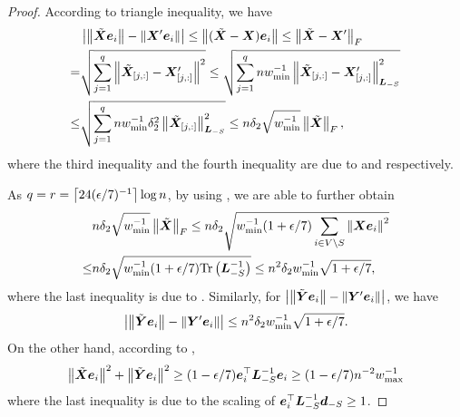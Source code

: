 \documentclass[sigconf]{acmart}
\begin{document}
\begin{proof}
    According to triangle inequality, we have
    \begin{align*}
            & \left|\left\Vert\tilde{\boldsymbol{X}}\boldsymbol{e}_i\right\Vert-\left\Vert\boldsymbol{X}'\boldsymbol{e}_i\right\Vert \right|\le\left\Vert(\tilde{\boldsymbol{X}}-\boldsymbol{X})\boldsymbol{e}_i\right\Vert\le\left\Vert\tilde{\boldsymbol{X}}-\boldsymbol{X}'\right\Vert_{F}                                  \\
        =   & \sqrt{\sum_{j=1}^q\left\Vert\tilde{\boldsymbol{X}}_{[j,:]}-\boldsymbol{X}'_{[j,:]}\right\Vert^2}\le\sqrt{\sum_{j=1}^qnw_{\min}^{-1}\left\Vert\tilde{\boldsymbol{X}}_{[j,:]}-\boldsymbol{X}'_{[j,:]}\right\Vert_{\boldsymbol{L}_{-S}}^2} \\
        \le & \sqrt{\sum_{j=1}^qnw_{\min}^{-1}\delta_2^2\left\Vert\tilde{\boldsymbol{X}}_{[j,:]}\right\Vert_{\boldsymbol{L}_{-S}}^2}\le n\delta_2\sqrt{w_{\min}^{-1}}\left\Vert\tilde{\boldsymbol{X}}\right\Vert_F,
    \end{align*}
    where the third inequality and the fourth inequality are due to  and  respectively.

    As \(q=r=\left\lceil24(\epsilon/7)^{-1}\right\rceil\log n\), by using , we are able to further obtain
    \begin{align*}
            & n\delta_2\sqrt{w_{\min}^{-1}}\left\Vert\tilde{\boldsymbol{X}}\right\Vert_F\le n\delta_2\sqrt{w_{\min}^{-1}(1+\epsilon/7)\sum_{i\in V\setminus S}\left\Vert\boldsymbol{X}\boldsymbol{e}_i\right\Vert^2} \\
        \le & n\delta_2\sqrt{w_{\min}^{-1}(1+\epsilon/7)\mathrm{Tr}\left(\boldsymbol{L}_{-S}^{-1}\right)}\le n^2\delta_2w_{\min}^{-1}\sqrt{1+\epsilon/7},
    \end{align*}
    where the last inequality is due to .
    Similarly, for \(\left|\left\Vert\tilde{\boldsymbol{Y}}\boldsymbol{e}_i\right\Vert-\left\Vert\boldsymbol{Y}'\boldsymbol{e}_i\right\Vert \right|\), we have
    \begin{equation}\label{eq:approx-maty-raw}
        \left|\left\Vert\tilde{\boldsymbol{Y}}\boldsymbol{e}_i\right\Vert-\left\Vert\boldsymbol{Y}'\boldsymbol{e}_i\right\Vert \right|\le n^2\delta_2w_{\min}^{-1}\sqrt{1+\epsilon/7}.
    \end{equation}
    On the other hand, according to ,
    \[\left\Vert\tilde{\boldsymbol{X}}\boldsymbol{e}_i\right\Vert^2+\left\Vert\tilde{\boldsymbol{Y}}\boldsymbol{e}_i\right\Vert^2\ge(1-\epsilon/7)\boldsymbol{e}_i^\top\boldsymbol{L}_{-S}^{-1}\boldsymbol{e}_i\ge(1-\epsilon/7)n^{-2}w_{\max}^{-1}\]
    where the last inequality is due to the scaling of \(\boldsymbol{e}_i^\top\boldsymbol{L}_{-S}^{-1}\boldsymbol{d}_{-S}\ge1\).


\end{proof}
\end{document}
